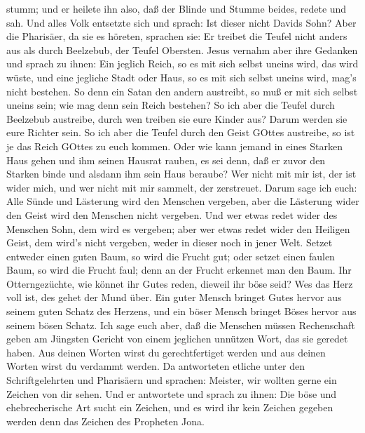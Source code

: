 stumm; und er heilete ihn also, daß der Blinde und Stumme beides, redete
und sah.  Und alles Volk entsetzte sich und sprach: Ist
dieser nicht Davids Sohn?  Aber die Pharisäer, da sie es
höreten, sprachen sie: Er treibet die Teufel nicht anders aus als durch
Beelzebub, der Teufel Obersten.  Jesus vernahm aber ihre
Gedanken und sprach zu ihnen: Ein jeglich Reich, so es mit sich selbst
uneins wird, das wird wüste, und eine jegliche Stadt oder Haus, so es
mit sich selbst uneins wird, mag's nicht bestehen.  So denn
ein Satan den andern austreibt, so muß er mit sich selbst uneins sein;
wie mag denn sein Reich bestehen?  So ich aber die Teufel
durch Beelzebub austreibe, durch wen treiben sie eure Kinder aus? Darum
werden sie eure Richter sein.  So ich aber die Teufel durch
den Geist GOttes austreibe, so ist je das Reich GOttes zu euch kommen.
 Oder wie kann jemand in eines Starken Haus gehen und ihm
seinen Hausrat rauben, es sei denn, daß er zuvor den Starken binde und
alsdann ihm sein Haus beraube?  Wer nicht mit mir ist, der
ist wider mich, und wer nicht mit mir sammelt, der zerstreuet.
 Darum sage ich euch: Alle Sünde und Lästerung wird den
Menschen vergeben, aber die Lästerung wider den Geist wird den Menschen
nicht vergeben.  Und wer etwas redet wider des Menschen
Sohn, dem wird es vergeben; aber wer etwas redet wider den Heiligen
Geist, dem wird's nicht vergeben, weder in dieser noch in jener Welt.
 Setzet entweder einen guten Baum, so wird die Frucht gut;
oder setzet einen faulen Baum, so wird die Frucht faul; denn an der
Frucht erkennet man den Baum.  Ihr Otterngezüchte, wie
könnet ihr Gutes reden, dieweil ihr böse seid? Wes das Herz voll ist,
des gehet der Mund über.  Ein guter Mensch bringet Gutes
hervor aus seinem guten Schatz des Herzens, und ein böser Mensch bringet
Böses hervor aus seinem bösen Schatz.  Ich sage euch aber,
daß die Menschen müssen Rechenschaft geben am Jüngsten Gericht von einem
jeglichen unnützen Wort, das sie geredet haben.  Aus deinen
Worten wirst du gerechtfertiget werden und aus deinen Worten wirst du
verdammt werden.  Da antworteten etliche unter den
Schriftgelehrten und Pharisäern und sprachen: Meister, wir wollten gerne
ein Zeichen von dir sehen.  Und er antwortete und sprach zu
ihnen: Die böse und ehebrecherische Art sucht ein Zeichen, und es wird
ihr kein Zeichen gegeben werden denn das Zeichen des Propheten Jona.
